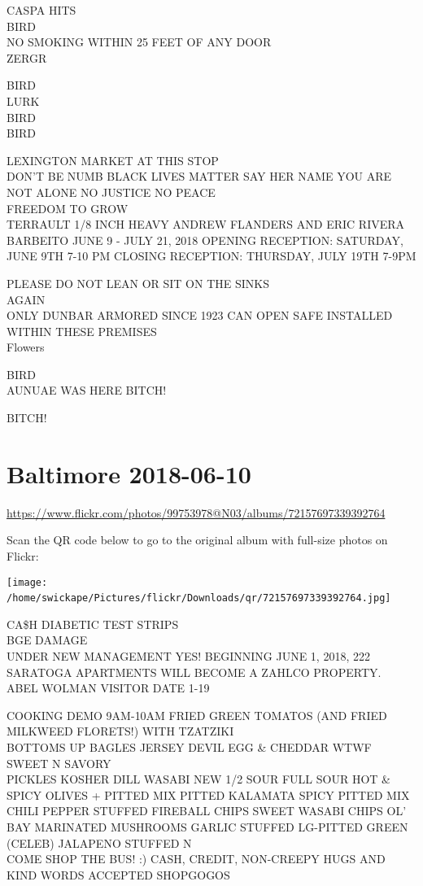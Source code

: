 \documentclass[10pt,letterpaper]{article}
\begin{document}
CASPA HITS\\
BIRD\\
NO SMOKING WITHIN 25 FEET OF ANY DOOR\\
ZERGR

BIRD\\
LURK\\
BIRD\\
BIRD

LEXINGTON MARKET AT THIS STOP\\
DON'T BE NUMB BLACK LIVES MATTER SAY HER NAME YOU ARE NOT ALONE NO JUSTICE NO PEACE\\
FREEDOM TO GROW\\
TERRAULT 1/8 INCH HEAVY ANDREW FLANDERS AND ERIC RIVERA BARBEITO JUNE 9 {-} JULY 21, 2018 OPENING RECEPTION: SATURDAY, JUNE 9TH 7{-}10 PM CLOSING RECEPTION: THURSDAY, JULY 19TH 7{-}9PM

PLEASE DO NOT LEAN OR SIT ON THE SINKS\\
AGAIN\\
ONLY DUNBAR ARMORED SINCE 1923 CAN OPEN SAFE INSTALLED WITHIN THESE PREMISES\\
Flowers

BIRD\\
AUNUAE WAS HERE BITCH!

BITCH!
\

\section*{Baltimore 2018-06-10}

\url{https://www.flickr.com/photos/99753978@N03/albums/72157697339392764}

Scan the QR code below to go to the original album with full-size photos on Flickr:

\texttt{[image: /home/swickape/Pictures/flickr/Downloads/qr/72157697339392764.jpg]}
\

CA\$H DIABETIC TEST STRIPS\\
BGE DAMAGE\\
UNDER NEW MANAGEMENT YES!  BEGINNING JUNE 1, 2018, 222 SARATOGA APARTMENTS WILL BECOME A ZAHLCO PROPERTY.\\
ABEL WOLMAN VISITOR DATE 1{-}19

COOKING DEMO 9AM{-}10AM FRIED GREEN TOMATOS (AND FRIED MILKWEED FLORETS!) WITH TZATZIKI\\
BOTTOMS UP BAGLES JERSEY DEVIL EGG \& CHEDDAR WTWF SWEET N SAVORY\\
PICKLES KOSHER DILL WASABI NEW 1/2 SOUR FULL SOUR HOT \& SPICY OLIVES + PITTED MIX PITTED KALAMATA SPICY PITTED MIX CHILI PEPPER STUFFED FIREBALL CHIPS SWEET WASABI CHIPS OL' BAY MARINATED MUSHROOMS GARLIC STUFFED LG{-}PITTED GREEN (CELEB) JALAPENO STUFFED N\\
COME SHOP THE BUS!  :) CASH, CREDIT, NON{-}CREEPY HUGS AND KIND WORDS ACCEPTED SHOPGOGOS
\end{document}
